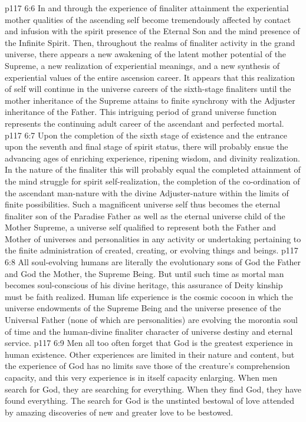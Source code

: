 \vs p117 6:6 In and through the experience of finaliter attainment the experiential mother qualities of the ascending self become tremendously affected by contact and infusion with the spirit presence of the Eternal Son and the mind presence of the Infinite Spirit. Then, throughout the realms of finaliter activity in the grand universe, there appears a new awakening of the latent mother potential of the Supreme, a new realization of experiential meanings, and a new synthesis of experiential values of the entire ascension career. It appears that this realization of self will continue in the universe careers of the sixth\hyp{}stage finaliters until the mother inheritance of the Supreme attains to finite synchrony with the Adjuster inheritance of the Father. This intriguing period of grand universe function represents the continuing adult career of the ascendant and perfected mortal.
\vs p117 6:7 Upon the completion of the sixth stage of existence and the entrance upon the seventh and final stage of spirit status, there will probably ensue the advancing ages of enriching experience, ripening wisdom, and divinity realization. In the nature of the finaliter this will probably equal the completed attainment of the mind struggle for spirit self\hyp{}realization, the completion of the co\hyp{}ordination of the ascendant man\hyp{}nature with the divine Adjuster\hyp{}nature within the limits of finite possibilities. Such a magnificent universe self thus becomes the eternal finaliter son of the Paradise Father as well as the eternal universe child of the Mother Supreme, a universe self qualified to represent both the Father and Mother of universes and personalities in any activity or undertaking pertaining to the finite administration of created, creating, or evolving things and beings.
\vs p117 6:8 All soul\hyp{}evolving humans are literally the evolutionary sons of God the Father and God the Mother, the Supreme Being. But until such time as mortal man becomes soul\hyp{}conscious of his divine heritage, this assurance of Deity kinship must be faith realized. Human life experience is the cosmic cocoon in which the universe endowments of the Supreme Being and the universe presence of the Universal Father (none of which are personalities) are evolving the morontia soul of time and the human\hyp{}divine finaliter character of universe destiny and eternal service.
\pc \vs p117 6:9 Men all too often forget that God is the greatest experience in human existence. Other experiences are limited in their nature and content, but the experience of God has no limits save those of the creature’s comprehension capacity, and this very experience is in itself capacity enlarging. When men search for God, they are searching for everything. When they find God, they have found everything. The search for God is the unstinted bestowal of love attended by amazing discoveries of new and greater love to be bestowed.
